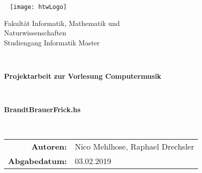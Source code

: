 \documentclass[
10pt, %
a4paper, %
oneside, %
headinclude,footinclude, %
BCOR5mm, %
]{scrartcl}
\title{\normalfont\spacedallcaps{Projektaufgabe AE}} %
\subtitle{Remove Duplicates - Spotify playlist cleaner} %
\author{\spacedlowsmallcaps{Raphael Drechsler}} %
\date{} %
\begin{document}

\renewcommand{\sectionmark}[1]{\markright{\spacedlowsmallcaps{#1}}} %
\lehead{\mbox{\llap{\small\thepage\kern1em\color{halfgray} \vline}\color{halfgray}\hspace{0.5em}\rightmark\hfil}} %

\pagestyle{scrheadings} %


{ \centering
{ \par}\
 \linebreak
\linebreak 
\linebreak
\linebreak
\linebreak
\texttt{[image: htwLogo]} 
\linebreak
\linebreak
\linebreak
\linebreak 
{\fontsize{14}{16}\selectfont \center Fakultät Informatik, Mathematik und\\Naturwissenschaften\\Studiengang Informatik Master\par}\
 \linebreak
{\fontsize{18}{20}\selectfont \center \textbf{Projektarbeit zur Vorlesung Computermusik}\par}\
{\fontsize{20}{22}\selectfont \center \textbf{BrandtBrauerFrick.hs} \par}\
\linebreak
\linebreak
\linebreak
\linebreak 
\linebreak
\linebreak 
\linebreak 
{\fontsize{14}{16}\selectfont  \begin{tabular}{rl}
 	\textbf{Autoren:} & Nico Mehlhose, Raphael Drechsler\\ 
 	\textbf{Abgabedatum:} & 03.02.2019 \\ 
 \end{tabular}
\par}
\par}
\pagebreak
\setcounter{tocdepth}{2} %
\end{document}

